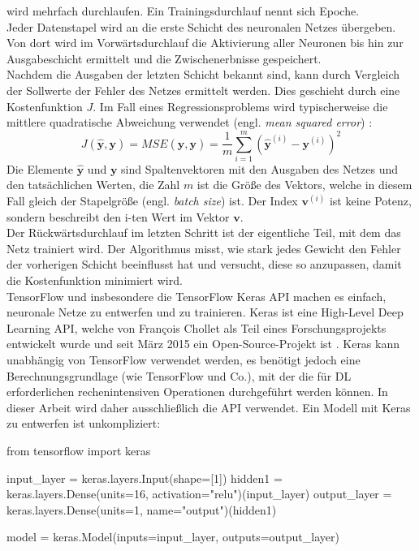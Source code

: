 wird mehrfach durchlaufen. Ein Trainingsdurchlauf nennt sich Epoche.\\[4pt]
Jeder Datenstapel wird an die erste Schicht des neuronalen Netzes
übergeben. Von dort wird im Vorwärtsdurchlauf die Aktivierung aller
Neuronen bis hin zur Ausgabeschicht ermittelt und die Zwischenerbnisse gespeichert.\\[4pt]
Nachdem die Ausgaben der letzten Schicht bekannt sind, kann
durch Vergleich der Sollwerte der Fehler des Netzes ermittelt werden.
Dies geschieht durch eine Kostenfunktion $J$. Im Fall eines Regressionsproblems
wird typischerweise die mittlere quadratische Abweichung verwendet
(engl. \textit{mean squared error}) \parencite[113-114]{book:hands-on-ml}:
\begin{equation}
  J(\mathbf{\hat{y}}, \mathbf{y}) =
  MSE(\mathbf{\hat{y}}, \mathbf{y}) =
    \frac{1}{m} \sum_{i=1}^{m} (\mathbf{\hat{y}}^{(i)} - \mathbf{y}^{(i)})^2
  \label{eq:mse}
\end{equation}
Die Elemente $\mathbf{\hat{y}}$ und $\mathbf{y}$ sind Spaltenvektoren
mit den Ausgaben des Netzes und den tatsächlichen Werten, die Zahl $m$
ist die Größe des Vektors, welche in diesem Fall gleich der Stapelgröße
(engl. \textit{batch size}) ist. Der Index $\mathbf{v}^{(i)}$ ist keine Potenz,
sondern beschreibt den i-ten Wert im Vektor $\mathbf{v}$.\\[4pt]
Der Rückwärtsdurchlauf im letzten Schritt ist der eigentliche Teil,
mit dem das Netz
trainiert wird. Der Algorithmus misst, wie stark jedes Gewicht den Fehler der
vorherigen Schicht beeinflusst hat und versucht, diese so anzupassen,
damit die Kostenfunktion minimiert wird.\\[8pt]
TensorFlow und insbesondere die TensorFlow Keras API
machen es einfach, neuronale Netze zu entwerfen und zu trainieren.
Keras ist eine High-Level Deep Learning API, welche
von François Chollet als Teil eines Forschungsprojekts entwickelt
wurde und seit März 2015 ein Open-Source-Projekt ist
\parencite[295]{book:hands-on-ml}. Keras kann
unabhängig von TensorFlow verwendet werden, es benötigt
jedoch eine Berechnungsgrundlage (wie TensorFlow und Co.),
mit der die für DL erforderlichen
rechenintensiven Operationen durchgeführt werden können.
In dieser Arbeit wird daher ausschließlich die  API
verwendet. Ein Modell mit Keras zu entwerfen ist unkompliziert:
\begin{pythoncode}
from tensorflow import keras

input_layer = keras.layers.Input(shape=[1])
hidden1 = keras.layers.Dense(units=16, activation="relu")(input_layer)
output_layer = keras.layers.Dense(units=1, name="output")(hidden1)

model = keras.Model(inputs=input_layer, outputs=output_layer)
\end{pythoncode}
